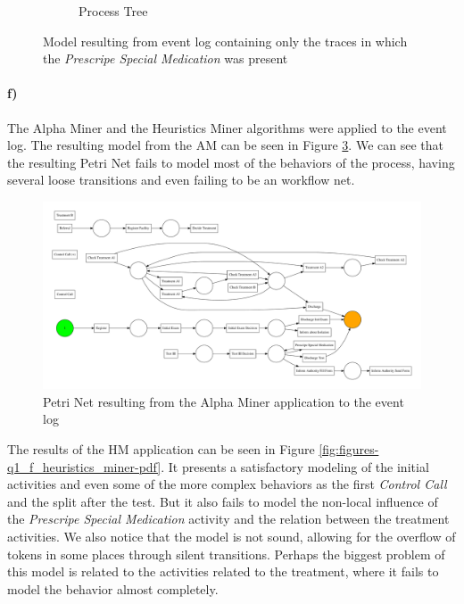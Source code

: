 \documentclass[12pt]{report}
\begin{document}
\begin{figure}[h]
\begin{subfigure}[b]{0.7\textwidth}
        \caption{Process Tree}
        \label{fig:q1_e_tree_special-pdf}
    \end{subfigure}
    \hfill
    \caption{Model resulting from event log containing only the traces in which the \emph{Prescripe Special Medication} was present}
    \label{fig:special-medication-model}
\end{figure}

\paragraph{f)} 

The Alpha Miner and the Heuristics Miner algorithms were applied to the event log. The resulting model from the AM can be seen in Figure \ref{fig:figures-q1_f_alpha_miner-pdf}. We can see that the resulting Petri Net fails to model most of the behaviors of the process, having several loose transitions and even failing to be an workflow net.

\begin{figure}[h]
    \centering
    \includegraphics[width=\textwidth]{figures/q1_f_alpha_miner.pdf}
    \caption{Petri Net resulting from the Alpha Miner application to the event log}
    \label{fig:figures-q1_f_alpha_miner-pdf}
\end{figure}

The results of the HM application can be seen in Figure \ref{fig:figures-q1_f_heuristics_miner-pdf}. It presents a satisfactory modeling of the initial activities and even some of the more complex behaviors as the first \emph{Control Call} and the split after the test. But it also fails to model the non-local influence of the \emph{Prescripe Special Medication} activity and the relation between the treatment activities. We also notice that the model is not sound, allowing for the overflow of tokens in some places through silent transitions. Perhaps the biggest problem of this model is related to the activities related to the treatment, where it fails to model the behavior almost completely.
\end{document}
